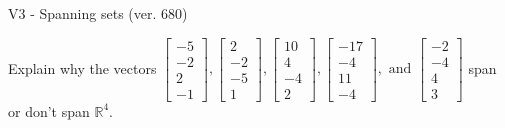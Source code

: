 \begin{exercise}
  \begin{exerciseTitle}V3 - Spanning sets (ver. 680)\end{exerciseTitle}
  \begin{exerciseStatement}
    Explain why the vectors \(\left[\begin{array}{r}
-5 \\
-2 \\
2 \\
-1
\end{array}\right] , \left[\begin{array}{r}
2 \\
-2 \\
-5 \\
1
\end{array}\right] , \left[\begin{array}{r}
10 \\
4 \\
-4 \\
2
\end{array}\right] , \left[\begin{array}{r}
-17 \\
-4 \\
11 \\
-4
\end{array}\right] , \text{ and } \left[\begin{array}{r}
-2 \\
-4 \\
4 \\
3
\end{array}\right]\) span or don't span \(\mathbb{R}^4\). 
	



\end{exerciseStatement}
\end{exercise}
